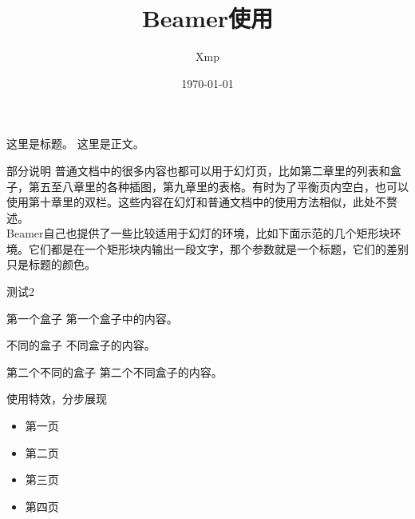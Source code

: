 \documentclass[UTF8]{beamer}
\begin{document}
	
\begin{frame}
	\title{Beamer使用}
	\author{Xmp}
	\date{\today}
	\maketitle
\end{frame}
	
\begin{frame}{这里是标题。}
	这里是正文。
\end{frame}


\begin{frame}{部分说明}
	普通文档中的很多内容也都可以用于幻灯页，比如第二章里的列表和盒子，第五至八章里的各种插图，第九章里的表格。有时为了平衡页内空白，也可以使用第十章里的双栏。这些内容在幻灯和普通文档中的使用方法相似，此处不赘述。\\
	
	Beamer自己也提供了一些比较适用于幻灯的环境，比如下面示范的几个矩形块环境。它们都是在一个矩形块内输出一段文字，那个参数就是一个标题，它们的差别只是标题的颜色。
\end{frame}

\begin{frame}{测试2}
	\begin{block}{第一个盒子}
		第一个盒子中的内容。
	\end{block}

	\begin{alertblock}{不同的盒子}
		不同盒子的内容。
	\end{alertblock}

	\begin{exampleblock}{第二个不同的盒子}
		第二个不同盒子的内容。
	\end{exampleblock}
\end{frame}

\begin{frame}{使用特效，分步展现}
	\begin{itemize}
		\item 第一页
		\pause
		\item 第二页
		\pause
		\item 第三页
		\pause
		\item 第四页
	\end{itemize}
\end{frame}
\end{document}
